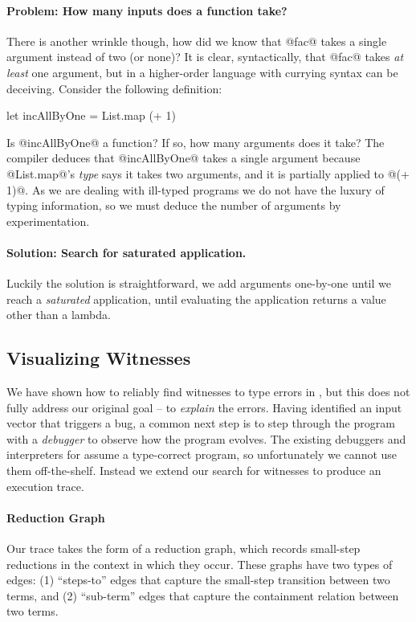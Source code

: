 \paragraph{Problem: How many inputs does a function take?}
There is another wrinkle though, how did we know that @fac@ takes
a single argument instead of two (or none)?
%
It is clear, syntactically, that @fac@ takes \emph{at least} one
argument, but in a higher-order language with currying syntax can be
deceiving. 
%
Consider the following definition:
%
\begin{code}
  let incAllByOne = List.map (+ 1)
\end{code}
%
Is @incAllByOne@ a function?
%
If so, how many arguments does it take?
%
The \ocaml compiler deduces that @incAllByOne@ takes a single argument
because @List.map@'s \emph{type} says it takes two arguments, and it is
partially applied to @(+ 1)@.
%
As we are dealing with ill-typed programs we do not have the luxury of
typing information, so we must deduce the number of arguments by
experimentation.

\paragraph{Solution: Search for saturated application.}
Luckily the solution is straightforward, we add arguments one-by-one
until we reach a \emph{saturated} application, \ie until evaluating the
application returns a value other than a lambda.

\subsection{Visualizing Witnesses}
\label{sec:visual-witness}
We have shown how to reliably find witnesses to type errors in \ocaml,
but this does not fully address our original goal -- to \emph{explain}
the errors.
%
Having identified an input vector that triggers a bug, a common next
step is to step through the program with a \emph{debugger} to observe
how the program evolves.
%
The existing debuggers and interpreters for \ocaml assume a type-correct
program, so unfortunately we cannot use them off-the-shelf.
%
Instead we extend our search for witnesses to produce an execution
trace.

\paragraph{Reduction Graph}
Our trace takes the form of a reduction graph, which records small-step
reductions in the context in which they occur.
%
These graphs have two types of edges: 
%
(1) ``steps-to'' edges that capture the small-step transition between
two terms, and
%
(2) ``sub-term'' edges that capture the containment relation between two
terms.

